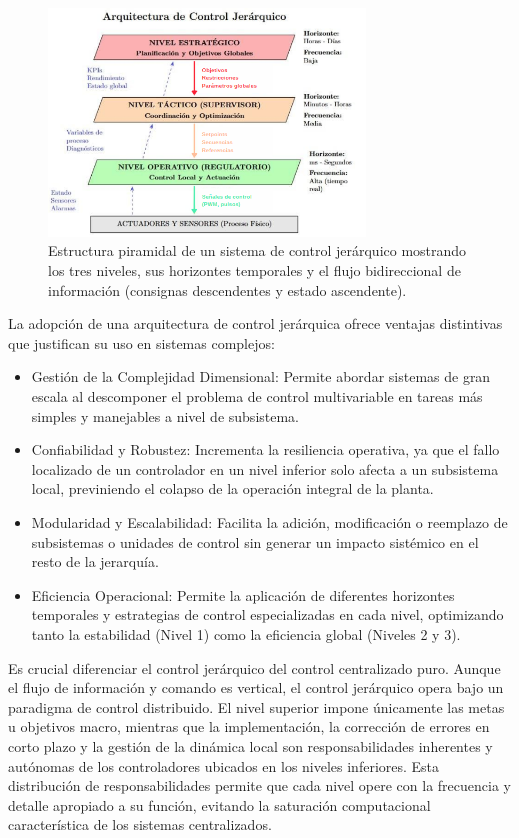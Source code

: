 \begin{figure}[H]
    \centering
    \includegraphics[width=0.75\textwidth]{img/jerarquia_control.png}
    \caption{Estructura piramidal de un sistema de control jerárquico mostrando los tres niveles, sus horizontes temporales y el flujo bidireccional de información (consignas descendentes y estado ascendente).}
    \label{fig:jerarquia_control}
\end{figure}
La adopción de una arquitectura de control jerárquica ofrece ventajas distintivas que justifican su uso en sistemas complejos:
\begin{itemize}
    \item Gestión de la Complejidad Dimensional: Permite abordar sistemas de gran escala al descomponer el problema de control multivariable en tareas más simples y manejables a nivel de subsistema.
    \item Confiabilidad y Robustez: Incrementa la resiliencia operativa, ya que el fallo localizado de un controlador en un nivel inferior solo afecta a un subsistema local, previniendo el colapso de la operación integral de la planta.
    \item Modularidad y Escalabilidad: Facilita la adición, modificación o reemplazo de subsistemas o unidades de control sin generar un impacto sistémico en el resto de la jerarquía.
    \item Eficiencia Operacional: Permite la aplicación de diferentes horizontes temporales y estrategias de control especializadas en cada nivel, optimizando tanto la estabilidad (Nivel 1) como la eficiencia global (Niveles 2 y 3).
\end{itemize}
Es crucial diferenciar el control jerárquico del control centralizado puro. Aunque el flujo de información y comando es vertical, el control jerárquico opera bajo un paradigma de control distribuido. El nivel superior impone únicamente las metas u objetivos macro, mientras que la implementación, la corrección de errores en corto plazo y la gestión de la dinámica local son responsabilidades inherentes y autónomas de los controladores ubicados en los niveles inferiores. Esta distribución de responsabilidades permite que cada nivel opere con la frecuencia y detalle apropiado a su función, evitando la saturación computacional característica de los sistemas centralizados.

